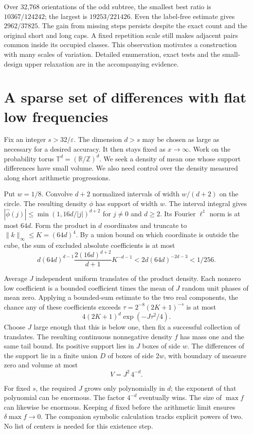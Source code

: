 \documentclass[12pt,letterpaper]{article}
\newcommand{\pagepart}[1]{\clearpage\section{#1}}
\begin{document}
Over 32,768 orientations of the odd subtree, the smallest best ratio is \(10367/124242\); the largest is \(19253/221426\). Even the label-free estimate gives \(2962/37825\). The gain from missing steps persists despite the exact count and the original short and long caps. A fixed repetition scale still makes adjacent pairs common inside its occupied classes. This observation motivates a construction with many scales of variation. Detailed enumeration, exact tests and the small-design upper relaxation are in the accompanying evidence.

\pagepart{A sparse set of differences with flat low frequencies}
Fix an integer \(s>32/\varepsilon\). The dimension \(d>s\) may be chosen as large as necessary for a desired accuracy. It then stays fixed as \(x\to\infty\). Work on the probability torus \(\mathbb T^d=(\mathbb R/\mathbb Z)^d\). We seek a density of mean one whose support differences have small volume. We also need control over the density measured along short arithmetic progressions.

Put \(w=1/8\). Convolve \(d+2\) normalized intervals of width \(w/(d+2)\) on the circle. The resulting density \(\phi\) has support of width \(w\). The interval integral gives \(|\widehat\phi(j)|\le\min(1,16d/|j|)^{d+2}\) for \(j\ne0\) and \(d\ge2\). Its Fourier \(\ell^1\) norm is at most \(64d\). Form the product in \(d\) coordinates and truncate to \(\|k\|_\infty\le K=(64d)^4\). By a union bound on which coordinate is outside the cube, the sum of excluded absolute coefficients is at most
\[
 d(64d)^{d-1}\frac{2(16d)^{d+2}}{d+1}K^{-d-1}
 < 2d(64d)^{-2d-3}<1/256 .
\]

Average \(J\) independent uniform translates of the product density. Each nonzero low coefficient is a bounded coefficient times the mean of \(J\) random unit phases of mean zero. Applying a bounded-sum estimate to the two real components, the chance any of these coefficients exceeds \(\tau=2^{-8}(2K+1)^{-s}\) is at most
\[
              4(2K+1)^d\exp(-J\tau^2/4).
\]
Choose \(J\) large enough that this is below one, then fix a successful collection of translates. The resulting continuous nonnegative density \(f\) has mass one and the same tail bound. Its positive support lies in \(J\) boxes of side \(w\). The differences of the support lie in a finite union \(D\) of boxes of side \(2w\), with boundary of measure zero and volume at most
\[
                           V=J^2\,4^{-d}.
\]

For fixed \(s\), the required \(J\) grows only polynomially in \(d\); the exponent of that polynomial can be enormous. The factor \(4^{-d}\) eventually wins. The size of \(\max f\) can likewise be enormous. Keeping \(d\) fixed before the arithmetic limit ensures \(\delta\max f\to0\). The companion symbolic calculation tracks explicit powers of two. No list of centers is needed for this existence step.
\end{document}
